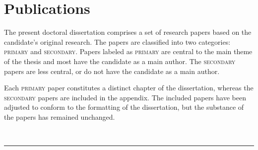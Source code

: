 
\chapter[publications]{Publications}

The present doctoral dissertation comprises a set of research papers based on the candidate's original research. The papers are classified into two categories: \textsc{primary} and \textsc{secondary}. 
Papers labeled as \textsc{primary} are central to the main theme of the thesis and most have the candidate as a main author. The \textsc{secondary} papers are less central, or do not have the candidate as a main author.

\noindent Each \textsc{primary} paper constitutes a distinct chapter of the dissertation, whereas the \textsc{secondary} papers are included in the appendix. The included papers have been adjusted to conform to the formatting of the dissertation, but the substance of the papers has remained unchanged.


\vspace{5mm}

\raggedright\par\noindent\hspace{8mm}{\Large\scshape primary}\\[-2mm]

\raggedleft\rule{\textwidth - 8mm}{0.4pt}

\begin{enumerate}[leftmargin=8mm,topsep=0mm,label={[\Alph*]}]
    \item {}
    \item {}
    \item {} 
    \item {}
\end{enumerate}

\newpage

\raggedright\par\noindent\hspace{8mm}{\Large\scshape secondary}\\[-2mm]


